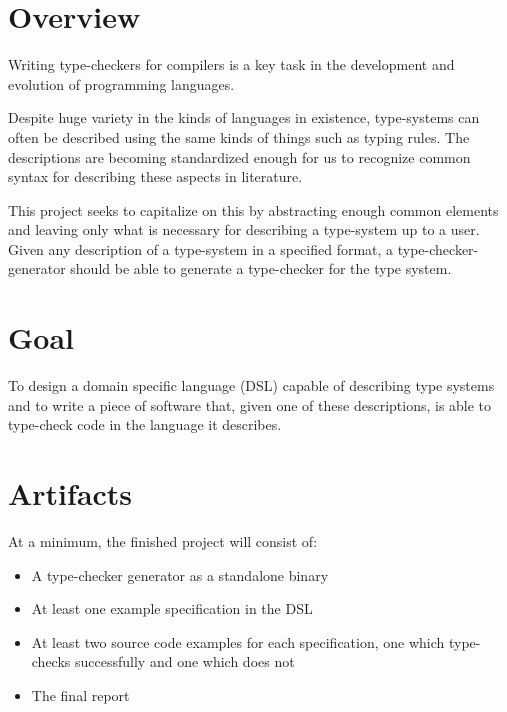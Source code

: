 \documentclass{ProgressReport}[2020/09/15]
\begin{document}
          \section{Overview}

          Writing type-checkers for compilers is a key task in the
          development and evolution of programming languages.

          Despite huge variety in the kinds of languages in existence,
          type-systems can often be described using the same kinds of
          things such as typing rules. The descriptions are becoming
          standardized enough for us to recognize common syntax for
          describing these aspects in literature.

          This project seeks to capitalize on this by abstracting
          enough common elements and leaving only what is necessary
          for describing a type-system up to a user. Given any
          description of a type-system in a specified format, a
          type-checker-generator should be able to generate a
          type-checker for the type system.
          
          \section{Goal}

          To design a domain specific language (DSL) capable of describing type systems and to
          write a piece of software that, given one of these
          descriptions, is able to type-check code in the language
          it describes.

          \section{Artifacts}

          At a minimum, the finished project will consist of:

          \begin{itemize}
          \item A type-checker generator as a standalone binary
          \item At least one example specification in the DSL
          \item At least two source code examples for each
            specification, one which type-checks successfully and one
            which does not
          \item The final report
          \end{itemize}
          
\end{document}
